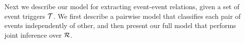 Next we describe our model for extracting event-event relations, given a set of event triggers $\mathcal{T}$. We first describe a pairwise model that classifies each pair of events independently of other, and then present our full model that performs joint inference over $\mathcal{R}$.





















